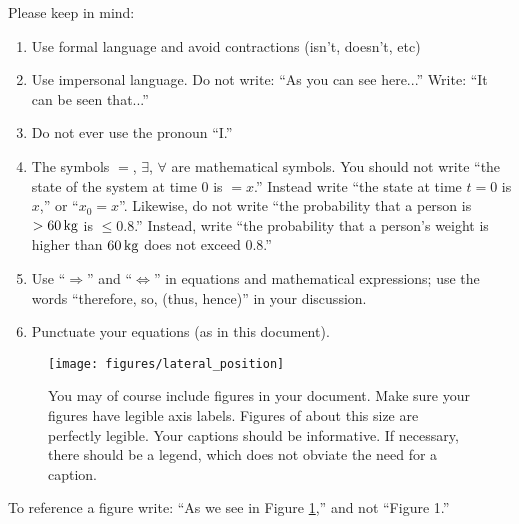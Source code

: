 \documentclass[a4paper,11pt,reqno]{amsart}
\begin{document}
\vspace{1em}
\begin{tcolorbox}[title={Language and style}]
    Please keep in mind:
    \begin{enumerate}
        \item Use formal language and avoid contractions (isn't,  doesn't, etc)
        \item Use impersonal language. Do not write: ``As you can see here...'' Write: ``It can be seen that...''
        \item Do not ever use the pronoun ``I.''
        \item The symbols $=$, $\exists$, $\forall$ are mathematical symbols. You should not write ``the state of the system at time $0$ is $=x$.'' Instead write ``the state at time $t=0$ is $x$,'' or ``$x_0 = x$''. Likewise, do not write ``the probability that a person is $>\unit[60]{kg}$ is $\leq 0.8$.'' Instead, write ``the probability that a person's weight is higher than $\unit[60]{kg}$ does not exceed $0.8$.''
        \item Use ``$\Rightarrow$'' and ``$\Leftrightarrow$'' in equations and mathematical expressions; use the words ``therefore, so, (thus, hence)'' in your discussion.
        \item Punctuate your equations (as in this document).
    \end{enumerate}
\end{tcolorbox}


\begin{figure}
    \centering
    \texttt{[image: figures/lateral\_position]}
    \caption{You may of course include figures in your document. Make sure your figures have legible axis labels. Figures of about this size are perfectly legible. Your captions should be informative. If necessary, there should be a legend, which does not obviate the need for a caption.}%
    \label{fig:system_trajectory}
\end{figure}

To reference a figure write: ``As we see in Figure \ref{fig:system_trajectory},'' and not ``Figure 1.''
\end{document}
